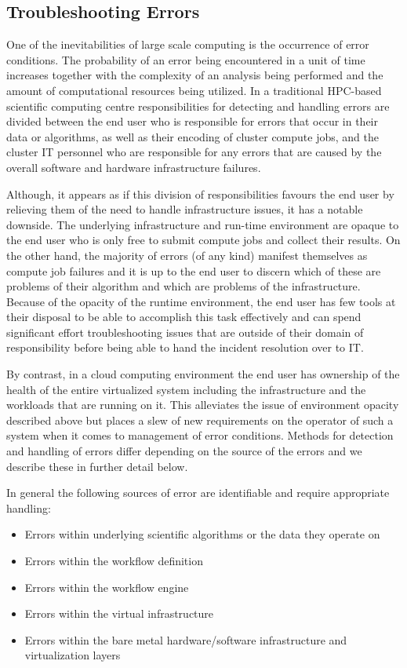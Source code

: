 \subsection {Troubleshooting Errors} \label{sec:troubleshooting}

One of the inevitabilities of large scale computing is the occurrence of error conditions. The probability of an error being encountered in a unit of time increases together with the complexity of an analysis being performed and the amount of computational resources being utilized. In a traditional HPC-based scientific computing centre responsibilities for detecting and handling errors are divided between the end user who is responsible for errors that occur in their data or algorithms, as well as their encoding of cluster compute jobs, and the cluster IT personnel who are responsible for any errors that are caused by the overall software and hardware infrastructure failures. 

Although, it appears as if this division of responsibilities favours the end user by relieving them of the need to handle infrastructure issues, it has a notable downside. The underlying infrastructure and run-time environment are opaque to the end user who is only free to submit compute jobs and collect their results. On the other hand, the majority of errors (of any kind) manifest themselves as compute job failures and it is up to the end user to discern which of these are problems of their algorithm and which are problems of the infrastructure. Because of the opacity of the runtime environment, the end user has few tools at their disposal to be able to accomplish this task effectively and can spend significant effort troubleshooting issues that are outside of their domain of responsibility before being able to hand the incident resolution over to IT.

By contrast, in a cloud computing environment the end user has ownership of the health of the entire virtualized system including the infrastructure and the workloads that are running on it. This alleviates the issue of environment opacity described above but places a slew of new requirements on the operator of such a system when it comes to management of error conditions. Methods for detection and handling of errors differ depending on the source of the errors and we describe these in further detail below.

In general the following sources of error are identifiable and require appropriate handling:

\begin{itemize}
\item Errors within underlying scientific algorithms or the data they operate on
\item Errors within the workflow definition
\item Errors within the workflow engine
\item Errors within the virtual infrastructure
\item Errors within the bare metal hardware/software infrastructure and virtualization layers
\end{itemize}

